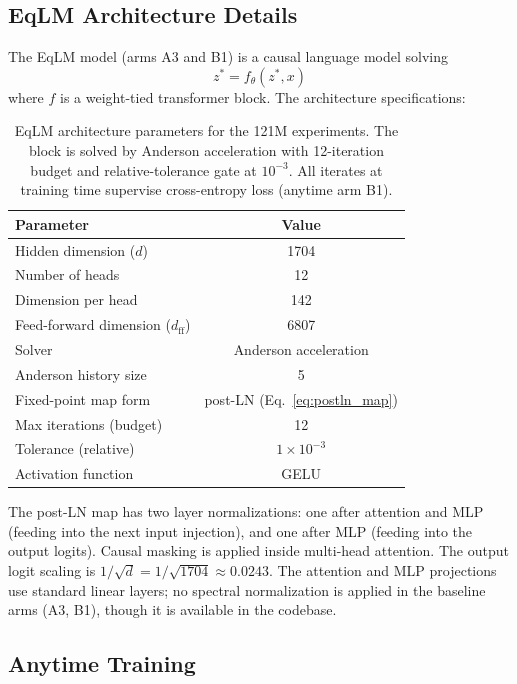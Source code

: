 \subsection{EqLM Architecture Details}

The EqLM model (arms A3 and B1) is a causal language model solving
\[ z^* = f_\theta(z^*, x) \]
where $f$ is a weight-tied transformer block. The architecture specifications:

\begin{table}[h]
\centering
\small
\caption{EqLM architecture parameters for the 121M experiments. The block is solved by Anderson acceleration with 12-iteration budget and relative-tolerance gate at $10^{-3}$. All iterates at training time supervise cross-entropy loss (anytime arm B1).}
\label{tab:eqlm_arch}
\begin{tabular}{@{}lc@{}}
\toprule
Parameter & Value \\
\midrule
Hidden dimension ($d$) & 1704 \\
Number of heads & 12 \\
Dimension per head & 142 \\
Feed-forward dimension ($d_{\text{ff}}$) & 6807 \\
Solver & Anderson acceleration \\
Anderson history size & 5 \\
Fixed-point map form & post-LN (Eq.\ \ref{eq:postln_map}) \\
Max iterations (budget) & 12 \\
Tolerance (relative) & $1 \times 10^{-3}$ \\
Activation function & GELU \\
\bottomrule
\end{tabular}
\end{table}

The post-LN map has two layer normalizations: one after attention and MLP (feeding into the next input injection), and one after MLP (feeding into the output logits). Causal masking is applied inside multi-head attention. The output logit scaling is $1/\sqrt{d} = 1/\sqrt{1704} \approx 0.0243$. The attention and MLP projections use standard linear layers; no spectral normalization is applied in the baseline arms (A3, B1), though it is available in the codebase.

\subsection{Anytime Training}

